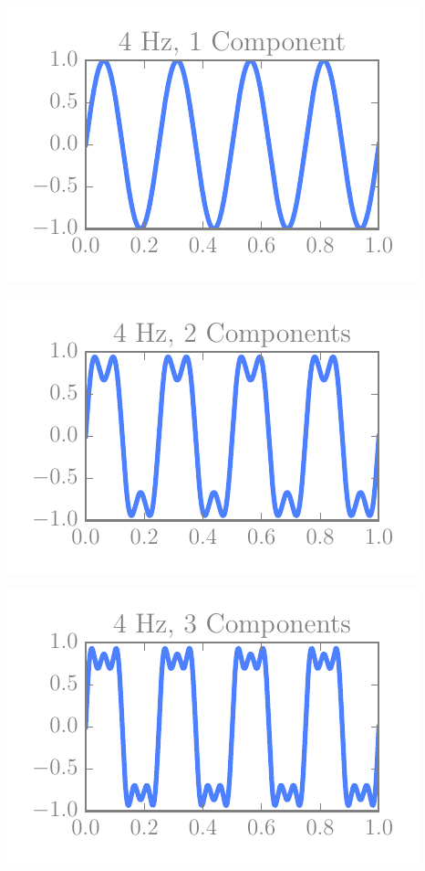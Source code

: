 \begin{multicols}{5}
\includegraphics[width=\linewidth]{../img/fouriers/4_1.pdf}

\includegraphics[width=\linewidth]{../img/fouriers/4_2.pdf}

\includegraphics[width=\linewidth]{../img/fouriers/4_3.pdf}


\end{multicols}
